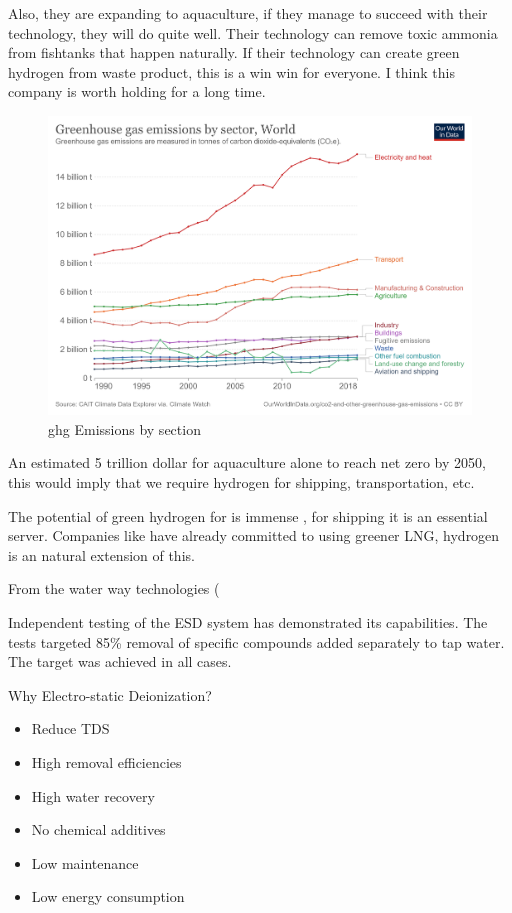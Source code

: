 Also, they are expanding to aquaculture, if they manage to succeed with their technology, they will do quite well. Their technology can remove toxic ammonia from fishtanks that happen naturally. If their technology can create green hydrogen from waste product, this is a win win for everyone. I think this company is worth holding for a long time.


\begin{figure}[h]
\includegraphics[width=\textwidth]{src/media/ghg-emissions-by-sector.png}
\caption{ghg Emissions by section}
\end{figure}

An estimated 5 trillion dollar for aquaculture alone \cite{goldman_sachs_hydrogen_2022} to reach net zero by 2050, this would imply that we require hydrogen for shipping, transportation, etc.


The potential of green hydrogen for is immense \cite{shipping_green_hydrogen}, for shipping it is an essential server. Companies like  have already committed to using greener LNG, hydrogen is an natural extension of this.

From the water way technologies (

Independent testing of the ESD system has demonstrated its capabilities. The tests targeted 85\% removal of specific compounds added separately to tap water. The target was achieved in all cases. \cite{cwti_esd}

Why Electro-static Deionization? 
\begin{itemize}
    \item Reduce TDS
    \item High removal efficiencies
    \item High water recovery
    \item No chemical additives
    \item Low maintenance
    \item Low energy consumption
\end{itemize}


